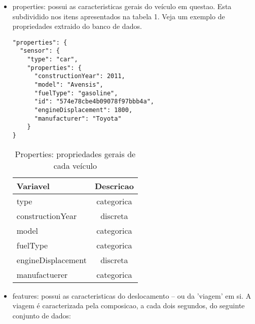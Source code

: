 \documentclass[10pt, conference]{IEEEtran}
\begin{document}
\begin{itemize}

  \item properties: possui as caracteristicas gerais do veículo em questao. Esta subdividido
  nos itens apresentados na tabela 1. Veja um exemplo de propriedades extraido do banco de dados.


\begin{lstlisting}
"properties": {
  "sensor": {
    "type": "car",
    "properties": {
      "constructionYear": 2011,
      "model": "Avensis",
      "fuelType": "gasoline",
      "id": "574e78cbe4b09078f97bbb4a",
      "engineDisplacement": 1800,
      "manufacturer": "Toyota"
    }
}
\end{lstlisting}



\begin{table}
\caption{Properties: propriedades gerais de cada veículo}
\label{tab:perfs}
\centering
\begin{tabular}{l|c}
\multicolumn{1}{l|}{\bf Variavel} &
\multicolumn{1}{l}{\bf Descricao}  \\ \hline
type                & categorica       \\
constructionYear    & discreta           \\
model               & categorica         \\
fuelType            & categorica           \\
engineDisplacement  & discreta             \\
manufactuerer       & categorica       
\end{tabular}
\end{table}

  \item features: possui as caracteristicas do deslocamento -- ou da 'viagem' em si. A viagem
  é caracterizada pela composicao, a cada dois segundos, do seguinte conjunto de dados:




\end{itemize}
\end{document}
